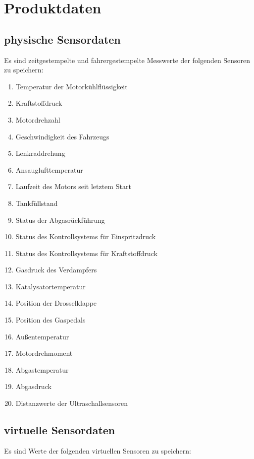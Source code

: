 \documentclass[pflichtenheft.tex]{subfiles}
\begin{document}
\chapter{Produktdaten}

\renewcommand{\theenumi}{/PD\ifnum \value{enumi}<10 0\fi\arabic{enumi}0/}
\renewcommand{\labelenumi}{\theenumi}
\renewcommand{\theenumii}{\arabic{enumii}}
\renewcommand{\labelenumii}{PD\ifnum \value{enumi}<10 0\fi\arabic{enumi}\arabic{enumii}/}

\section{\mkd physische Sensordaten}
Es sind zeitgestempelte und fahrergestempelte Messwerte der folgenden Sensoren zu speichern:
\begin{enumerate}
\item
Temperatur der Motorkühlflüssigkeit
\item
Kraftstoffdruck
\item
Motordrehzahl
\item
Geschwindigkeit des Fahrzeugs
\item
Lenkraddrehung
\item
Ansauglufttemperatur 
\item
Laufzeit des Motors seit letztem Start
\item
Tankfüllstand
\item
Status der Abgasrückführung
\item
Status des Kontrollsystems für Einspritzdruck
\item
Status des Kontrollsystems für Kraftstoffdruck
\item
Gasdruck des Verdampfers
\item
Katalysatortemperatur
\item
Position der Drosselklappe
\item
Position des Gaspedals
\item
Außentemperatur
\item
Motordrehmoment
\item
Abgastemperatur
\item
Abgasdruck
\item
Distanzwerte der Ultraschallsensoren
\setcounter{enumTemp}{\value{enumi}}
\end{enumerate}

\section{\mkd virtuelle Sensordaten}
Es sind Werte der folgenden virtuellen Sensoren zu speichern:
\end{document}

